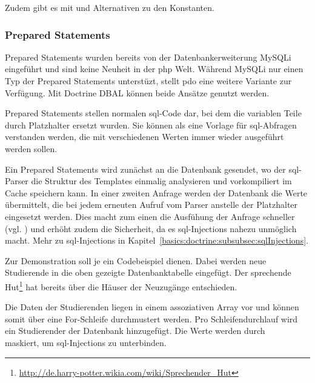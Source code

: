 Zudem gibt es mit  und  Alternativen zu den Konstanten.

\subsubsection{Prepared Statements}
\label{basics:doctrine:subsubsec:preparedStatements}
Prepared Statements wurden bereits von der Datenbankerweiterung MySQLi eingeführt und sind keine Neuheit in der \gls{php} Welt. Während MySQLi nur einen Typ der Prepared Statements unterstüzt, stellt \gls{pdo} eine weitere Variante zur Verfügung. Mit Doctrine DBAL können beide Ansätze genutzt werden.

Prepared Statements stellen normalen \gls{sql}-Code dar, bei dem die variablen Teile durch Platzhalter ersetzt wurden. Sie können als eine Vorlage für \gls{sql}-Abfragen verstanden werden, die mit verschiedenen Werten immer wieder ausgeführt werden sollen.

Ein Prepared Statements wird zunächst an die Datenbank gesendet, wo der \gls{sql}-Parser die Struktur des Templates einmalig analysieren und vorkompiliert im Cache speichern kann. In einer zweiten Anfrage werden der Datenbank die Werte übermittelt, die bei jedem erneuten Aufruf vom Parser anstelle der Platzhalter eingesetzt werden. Dies macht zum einen die Ausfühung der Anfrage schneller (vgl. \cite[S. 75]{book:popel2007pdo}) und erhöht zudem die Sicherheit, da es \gls{sql}-Injections nahezu unmöglich macht. Mehr zu \gls{sql}-Injections in Kapitel~\ref{basics:doctrine:subsubsec:sqlInjections}.

Zur Demonstration soll je ein Codebeispiel dienen. Dabei werden neue Studierende in die oben gezeigte Datenbanktabelle eingefügt. Der sprechende Hut\footnote{\url{http://de.harry-potter.wikia.com/wiki/Sprechender_Hut}} hat bereits über die Häuser der Neuzugänge entschieden.

Die Daten der Studierenden liegen in einem assoziativen Array vor und können somit über eine For-Schleife durchmustert werden. Pro Schleifendurchlauf wird ein Studierender der Datenbank hinzugefügt. Die Werte werden durch\\
 maskiert, um \gls{sql}-Injections zu unterbinden.

